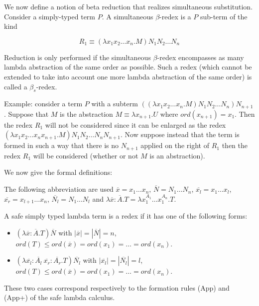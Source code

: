 \documentclass{article}
\begin{document}
We now define a notion of beta reduction that realizes simultaneous
substitution. Consider a simply-typed term $P$. A simultaneous
$\beta$-redex is a $P$ sub-term of the kind

$$R_1 \equiv (\lambda x_1 x_2 \ldots x_n . M) N_1 N_2 \ldots N_n$$

Reduction is only performed if the simultaneous $\beta$-redex
encompasses as many lambda abstraction of the same order as
possible. Such a redex (which cannot be extended to take into
account one more lambda abstraction of the same order) is called a
$\beta_s$-redex.


Example: consider a term $P$ with a subterm $((\lambda x_1 x_2
\ldots x_n . M) N_1 N_2 \ldots N_n) N_{n+1}$. Suppose that $M$ is
the abstraction $M \equiv \lambda x_{n+1} . U$ where $ord(x_{n+1}) =
x_1$. Then the redex $R_1$ will not be considered since it can be
enlarged as the redex $(\lambda x_1 x_2 \ldots x_n x_{n+1}. M) N_1
N_2 \ldots N_n N_{n+1}$. Now suppose instead that the term is formed
in such a way that there is no $N_{n+1}$ applied on the right of
$R_1$ then the redex $R_1$ will be considered (whether or not $M$ is
an abstraction).

We now give the formal definitions:

The following abbreviation are used $\overline{x} = x_1 \ldots x_n$,
$\overline{N} = N_1 \ldots N_n$, $\overline{x_l} = x_1 \ldots x_l$,
$\overline{x_r} = x_{l+1} \ldots x_n$, $\overline{N_l} = N_1 \ldots
N_l$ and $\lambda \overline{x} : \overline{A} . T = \lambda
x_1^{A_1} \ldots x_1^{A_n} . T$.

\begin{dfn}
A safe simply typed lambda term is a redex if it has one of the
following forms:
\begin{itemize}
\item $(\lambda \overline{x} : \overline{A} . T) \overline{N}$
\quad with $|\overline{x}| = |\overline{N}| = n$, $ord(T) \leq
ord(\overline{x}) = ord(x_1) = \ldots = ord(x_n)$.

\item $(\lambda \overline{x_l} : \overline{A_l} \ \overline{x_r}: \overline{A_r} . T) \overline{N_l}$
\quad with $|\overline{x_l}| = |\overline{N_l}| = l$, $ord(T) \leq
ord(\overline{x}) = ord(x_1) = \ldots = ord(x_n)$.
\end{itemize}

These two cases correspond respectively to the formation rules (App)
and (App+) of the safe lambda calculus.

\end{dfn}
\end{document}
